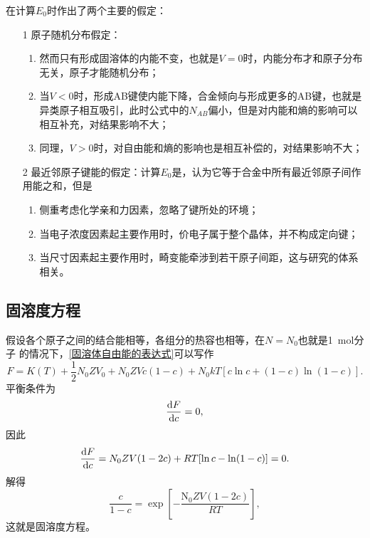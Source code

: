             在计算$E_0$时作出了两个主要的假定：
            \begin{enumerate}
                \item[1] 原子随机分布假定：
                \begin{enumerate}
                    \item 然而只有形成固溶体的内能不变，也就是$V=0$时，内能分布才和原子分布无关，原子才能随机分布；
                    \item 当$V<0$时，形成AB键使内能下降，合金倾向与形成更多的AB键，也就是异类原子相互吸引，此时公式中的$N_{AB}$偏小，但是对内能和熵的影响可以相互补充，对结果影响不大；
                    \item 同理，$V>0$时，对自由能和熵的影响也是相互补偿的，对结果影响不大；
                \end{enumerate} 
                \item[2] 最近邻原子键能的假定：计算$E_0$是，认为它等于合金中所有最近邻原子间作用能之和，但是
                \begin{enumerate}
                    \item 侧重考虑化学亲和力因素，忽略了键所处的环境；
                    \item 当电子浓度因素起主要作用时，价电子属于整个晶体，并不构成定向键；
                    \item 当尺寸因素起主要作用时，畸变能牵涉到若干原子间距，这与研究的体系相关。
                \end{enumerate} 
            \end{enumerate}
        \subsection{固溶度方程}
            假设各个原子之间的结合能相等，各组分的热容也相等，在$N=N_0$也就是\SI{1}{\mol}分子
            的情况下，\autoref{固溶体自由能的表达式}可以写作
            \begin{equation}
                F=K(T)+\frac{1}{2}N_{0} Z V_{0}+N_{0} Z V c(1-c)+N_{0} k T[c \ln c+(1-c) \ln (1-c)].
            \end{equation}
            平衡条件为
            \begin{equation}
                \frac{\mathop{}\!\mathrm{d} F}{\mathop{}\!\mathrm{d} c}=0,
            \end{equation}
            因此
            \begin{equation}
                \frac{\mathop{}\!\mathrm{d} F}{\mathop{}\!\mathrm{d} c}=N_{0} Z V(1-2 c)+R T[\ln c-\ln (1-c)]=0.
            \end{equation}
            解得
            \begin{equation}
                \frac{c}{1-c}=\exp \left[-\frac{\mathrm{N}_{0} Z V(1-2 c)}{R T}\right],
            \end{equation}
            这就是固溶度方程。


